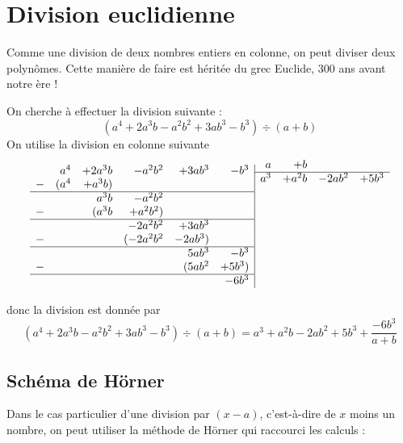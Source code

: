 \section{Division euclidienne}

Comme une division de deux nombres entiers en colonne, on peut diviser deux polynômes. Cette manière de faire est héritée du grec Euclide, 300 ans avant notre ère !

\begin{exemple}
On cherche à effectuer la division suivante :
$$
(a^4 + 2a^3 b - a^2 b^2 + 3 a b^3 - b^3)\div (a+b)
$$
On utilise la division en colonne suivante
$$
\begin{array}{rrrrrr|}
&a^4& + 2a^3 b& - a^2 b^2& + 3 a b^3& - b^3\\
-&(a^4& + a^3b) & & & \\
\hline
& & a^3 b & -a^2b^2 &&\\
-& &(a^3 b &+ a^2 b^2)&&\\
\hline
& & &- 2a^2b^2 & + 3 a b^3 &\\
-& & &(-2a^2b^2 & - 2 a b^3) &\\
\hline
&&&& 5a b^3 &- b^3\\
-&&&&(5ab^2 &+ 5b^3)\\
\hline
&&&&&-6b^3 \\
\end{array}
\begin{array}{rrrr}
a&+b && \\
\hline
a^3 &+ a^2 b &-2ab^2& +5b^3 \\
&&&\\&&&\\&&&\\&&&\\&&&\\&&&\\&&&\\&&&\\
\end{array}
$$
donc la division est donnée par
$$
(a^4 + 2a^3 b - a^2 b^2 + 3 a b^3 - b^3)\div (a+b) = a^3 + a^2 b -2ab^2 +5b^3 + \frac{-6b^3}{a+b}
$$
\end{exemple}

\subsection{Schéma de Hörner}\label{horner}

Dans le cas particulier d'une division par $(x-a)$, c'est-à-dire de $x$ moins un nombre, on peut utiliser la méthode de Hörner qui raccourci les calculs :

